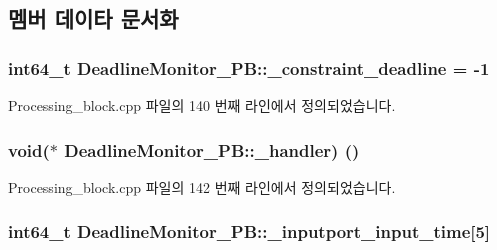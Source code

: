 \subsection{멤버 데이타 문서화}
\subsubsection[{\texorpdfstring{\+\_\+constraint\+\_\+deadline}{_constraint_deadline}}]{\setlength{\rightskip}{0pt plus 5cm}int64\+\_\+t Deadline\+Monitor\+\_\+\+P\+B\+::\+\_\+constraint\+\_\+deadline = -\/1\hspace{0.3cm}{\ttfamily [private]}}\hypertarget{classDeadlineMonitor__PB_a4aff480c381c68671213b6c3779bb137}{}\label{classDeadlineMonitor__PB_a4aff480c381c68671213b6c3779bb137}


Processing\+\_\+block.\+cpp 파일의 140 번째 라인에서 정의되었습니다.

\subsubsection[{\texorpdfstring{\+\_\+handler}{_handler}}]{\setlength{\rightskip}{0pt plus 5cm}void($\ast$ Deadline\+Monitor\+\_\+\+P\+B\+::\+\_\+handler) ()\hspace{0.3cm}{\ttfamily [private]}}\hypertarget{classDeadlineMonitor__PB_a637df7fb7c75351ea967d45c64f3af13}{}\label{classDeadlineMonitor__PB_a637df7fb7c75351ea967d45c64f3af13}


Processing\+\_\+block.\+cpp 파일의 142 번째 라인에서 정의되었습니다.

\subsubsection[{\texorpdfstring{\+\_\+inputport\+\_\+input\+\_\+time}{_inputport_input_time}}]{\setlength{\rightskip}{0pt plus 5cm}int64\+\_\+t Deadline\+Monitor\+\_\+\+P\+B\+::\+\_\+inputport\+\_\+input\+\_\+time\mbox{[}5\mbox{]}\hspace{0.3cm}{\ttfamily [private]}}\hypertarget{classDeadlineMonitor__PB_af11957e5aef255a6be8fb21f2f3719d7}{}\label{classDeadlineMonitor__PB_af11957e5aef255a6be8fb21f2f3719d7}


